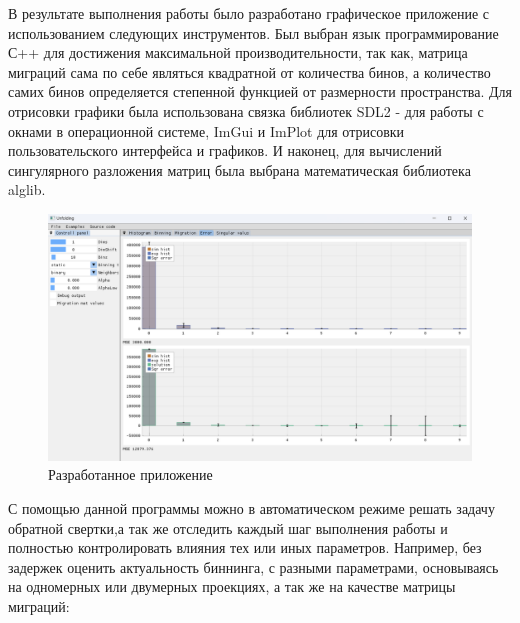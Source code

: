 \documentclass[a4paper,12pt]{diplom}
\begin{document}

В результате выполнения работы было разработано графическое приложение с использованием следующих инструментов. Был выбран язык программирование С++ для 
достижения максимальной производительности, так как, матрица миграций сама по себе являться квадратной от количества бинов, а количество самих 
бинов определяется степенной функцией от размерности пространства. Для отрисовки графики была использована связка библиотек SDL2 - для работы с 
окнами в операционной системе, ImGui и ImPlot для отрисовки пользовательского интерфейса и графиков. И наконец, для вычислений сингулярного 
разложения матриц была выбрана математическая библиотека alglib.

\begin{figure}[h!]
   \centering
   \includegraphics[width=\linewidth]{images/app_example.png}
   \caption{Разработанное приложение}
\end{figure}


С помощью данной программы можно в автоматическом режиме решать задачу обратной свертки,а так же отследить каждый шаг выполнения работы и полностью 
контролировать влияния тех или иных параметров. Например, без задержек оценить актуальность биннинга, с разными параметрами, основываясь 
на одномерных или двумерных проекциях, а так же на качестве матрицы миграций: 

\clearpage
\end{document}
